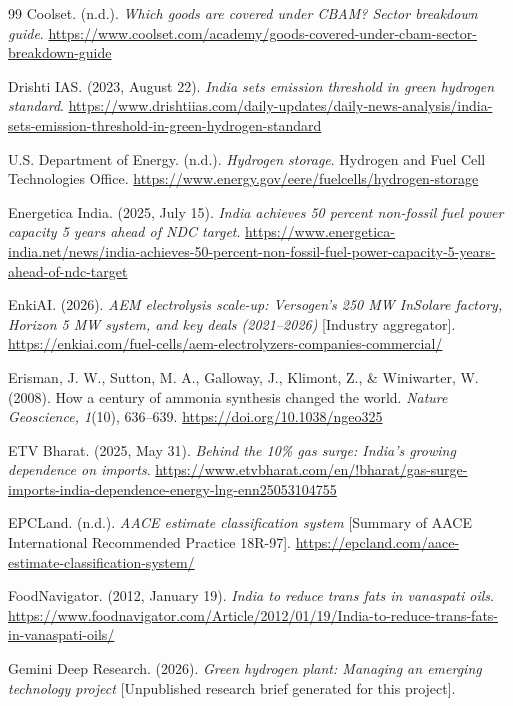 {\begin{thebibliography}{99}
 Coolset. (n.d.). \emph{Which goods are covered under CBAM? Sector breakdown guide}. \url{https://www.coolset.com/academy/goods-covered-under-cbam-sector-breakdown-guide}

 Drishti IAS. (2023, August 22). \emph{India sets emission threshold in green hydrogen standard}. \url{https://www.drishtiias.com/daily-updates/daily-news-analysis/india-sets-emission-threshold-in-green-hydrogen-standard}

 U.S. Department of Energy. (n.d.). \emph{Hydrogen storage}. Hydrogen and Fuel Cell Technologies Office. \url{https://www.energy.gov/eere/fuelcells/hydrogen-storage}

 Energetica India. (2025, July 15). \emph{India achieves 50 percent non-fossil fuel power capacity 5 years ahead of NDC target}. \url{https://www.energetica-india.net/news/india-achieves-50-percent-non-fossil-fuel-power-capacity-5-years-ahead-of-ndc-target}

 EnkiAI. (2026). \emph{AEM electrolysis scale-up: Versogen's 250 MW InSolare factory, Horizon 5 MW system, and key deals (2021–2026)} [Industry aggregator]. \url{https://enkiai.com/fuel-cells/aem-electrolyzers-companies-commercial/}

 Erisman, J. W., Sutton, M. A., Galloway, J., Klimont, Z., \& Winiwarter, W. (2008). How a century of ammonia synthesis changed the world. \emph{Nature Geoscience, 1}(10), 636–639. \url{https://doi.org/10.1038/ngeo325}

 ETV Bharat. (2025, May 31). \emph{Behind the 10\% gas surge: India's growing dependence on imports}. \url{https://www.etvbharat.com/en/!bharat/gas-surge-imports-india-dependence-energy-lng-enn25053104755}

 EPCLand. (n.d.). \emph{AACE estimate classification system} [Summary of AACE International Recommended Practice 18R-97]. \url{https://epcland.com/aace-estimate-classification-system/}

 FoodNavigator. (2012, January 19). \emph{India to reduce trans fats in vanaspati oils}. \url{https://www.foodnavigator.com/Article/2012/01/19/India-to-reduce-trans-fats-in-vanaspati-oils/}

 Gemini Deep Research. (2026). \emph{Green hydrogen plant: Managing an emerging technology project} [Unpublished research brief generated for this project].


\end{thebibliography}}
